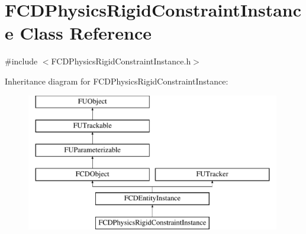\hypertarget{classFCDPhysicsRigidConstraintInstance}{
\section{FCDPhysicsRigidConstraintInstance Class Reference}
\label{classFCDPhysicsRigidConstraintInstance}
}


{\ttfamily \#include $<$FCDPhysicsRigidConstraintInstance.h$>$}

Inheritance diagram for FCDPhysicsRigidConstraintInstance:\begin{figure}[H]
\begin{center}
\leavevmode
\includegraphics[height=6.000000cm]{classFCDPhysicsRigidConstraintInstance}
\end{center}
\end{figure}
